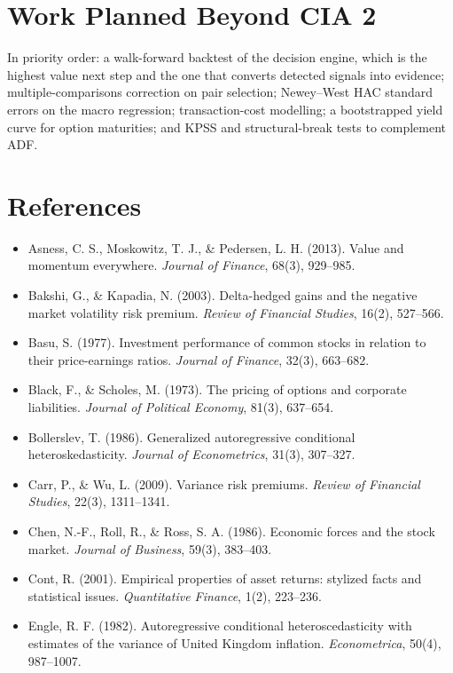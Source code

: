\documentclass[11pt,a4paper]{article}
\begin{document}
\section{Work Planned Beyond CIA 2}

In priority order: a walk-forward backtest of the decision engine, which is the highest
value next step and the one that converts detected signals into evidence;
multiple-comparisons correction on pair selection; Newey--West HAC standard errors on the
macro regression; transaction-cost modelling; a bootstrapped yield curve for option
maturities; and KPSS and structural-break tests to complement ADF.

\section*{References}
\begin{itemize}[leftmargin=1.2em,labelsep=0.4em,label={}]
\item Asness, C. S., Moskowitz, T. J., \& Pedersen, L. H. (2013). Value and momentum everywhere. \emph{Journal of Finance}, 68(3), 929--985.
\item Bakshi, G., \& Kapadia, N. (2003). Delta-hedged gains and the negative market volatility risk premium. \emph{Review of Financial Studies}, 16(2), 527--566.
\item Basu, S. (1977). Investment performance of common stocks in relation to their price-earnings ratios. \emph{Journal of Finance}, 32(3), 663--682.
\item Black, F., \& Scholes, M. (1973). The pricing of options and corporate liabilities. \emph{Journal of Political Economy}, 81(3), 637--654.
\item Bollerslev, T. (1986). Generalized autoregressive conditional heteroskedasticity. \emph{Journal of Econometrics}, 31(3), 307--327.
\item Carr, P., \& Wu, L. (2009). Variance risk premiums. \emph{Review of Financial Studies}, 22(3), 1311--1341.
\item Chen, N.-F., Roll, R., \& Ross, S. A. (1986). Economic forces and the stock market. \emph{Journal of Business}, 59(3), 383--403.
\item Cont, R. (2001). Empirical properties of asset returns: stylized facts and statistical issues. \emph{Quantitative Finance}, 1(2), 223--236.
\item Engle, R. F. (1982). Autoregressive conditional heteroscedasticity with estimates of the variance of United Kingdom inflation. \emph{Econometrica}, 50(4), 987--1007.

\end{itemize}
\end{document}

